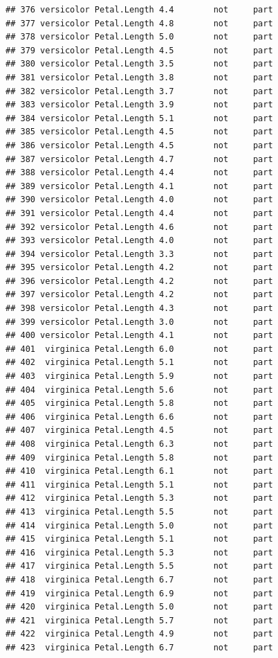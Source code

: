 \documentclass[krantz2]{krantz}\usepackage{knitr}%
\begin{document}
\begin{knitrout}
\begin{kframe}
\begin{verbatim}
## 376 versicolor Petal.Length 4.4        not     part
## 377 versicolor Petal.Length 4.8        not     part
## 378 versicolor Petal.Length 5.0        not     part
## 379 versicolor Petal.Length 4.5        not     part
## 380 versicolor Petal.Length 3.5        not     part
## 381 versicolor Petal.Length 3.8        not     part
## 382 versicolor Petal.Length 3.7        not     part
## 383 versicolor Petal.Length 3.9        not     part
## 384 versicolor Petal.Length 5.1        not     part
## 385 versicolor Petal.Length 4.5        not     part
## 386 versicolor Petal.Length 4.5        not     part
## 387 versicolor Petal.Length 4.7        not     part
## 388 versicolor Petal.Length 4.4        not     part
## 389 versicolor Petal.Length 4.1        not     part
## 390 versicolor Petal.Length 4.0        not     part
## 391 versicolor Petal.Length 4.4        not     part
## 392 versicolor Petal.Length 4.6        not     part
## 393 versicolor Petal.Length 4.0        not     part
## 394 versicolor Petal.Length 3.3        not     part
## 395 versicolor Petal.Length 4.2        not     part
## 396 versicolor Petal.Length 4.2        not     part
## 397 versicolor Petal.Length 4.2        not     part
## 398 versicolor Petal.Length 4.3        not     part
## 399 versicolor Petal.Length 3.0        not     part
## 400 versicolor Petal.Length 4.1        not     part
## 401  virginica Petal.Length 6.0        not     part
## 402  virginica Petal.Length 5.1        not     part
## 403  virginica Petal.Length 5.9        not     part
## 404  virginica Petal.Length 5.6        not     part
## 405  virginica Petal.Length 5.8        not     part
## 406  virginica Petal.Length 6.6        not     part
## 407  virginica Petal.Length 4.5        not     part
## 408  virginica Petal.Length 6.3        not     part
## 409  virginica Petal.Length 5.8        not     part
## 410  virginica Petal.Length 6.1        not     part
## 411  virginica Petal.Length 5.1        not     part
## 412  virginica Petal.Length 5.3        not     part
## 413  virginica Petal.Length 5.5        not     part
## 414  virginica Petal.Length 5.0        not     part
## 415  virginica Petal.Length 5.1        not     part
## 416  virginica Petal.Length 5.3        not     part
## 417  virginica Petal.Length 5.5        not     part
## 418  virginica Petal.Length 6.7        not     part
## 419  virginica Petal.Length 6.9        not     part
## 420  virginica Petal.Length 5.0        not     part
## 421  virginica Petal.Length 5.7        not     part
## 422  virginica Petal.Length 4.9        not     part
## 423  virginica Petal.Length 6.7        not     part

\end{verbatim}
\end{kframe}
\end{knitrout}
\end{document}
